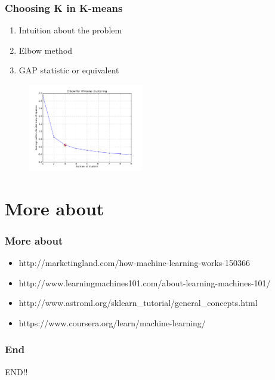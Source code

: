 \documentclass{beamer}
\begin{document}
\begin{frame}
	\frametitle{Choosing K in K-means}
	\begin{enumerate}
		\item Intuition about the problem
		\item Elbow method
		\item GAP statistic or equivalent
	\end{enumerate}
	\begin{figure}
		\centering
		\includegraphics[keepaspectratio, width=0.45\textwidth]{graphics/elbow}
	\end{figure}
\end{frame}

\section{More about}
\begin{frame}
	\frametitle{More about}
	\begin{itemize}
		\item http://marketingland.com/how-machine-learning-works-150366
		\item http://www.learningmachines101.com/about-learning-machines-101/
		\item http://www.astroml.org/sklearn\_tutorial/general\_concepts.html
		\item https://www.coursera.org/learn/machine-learning/
	\end{itemize}
\end{frame}


\begin{frame}
\frametitle{End}
\begin{center}
	\begin{Large}
		END!!
	\end{Large}
\end{center}
\end{frame}
\end{document}
